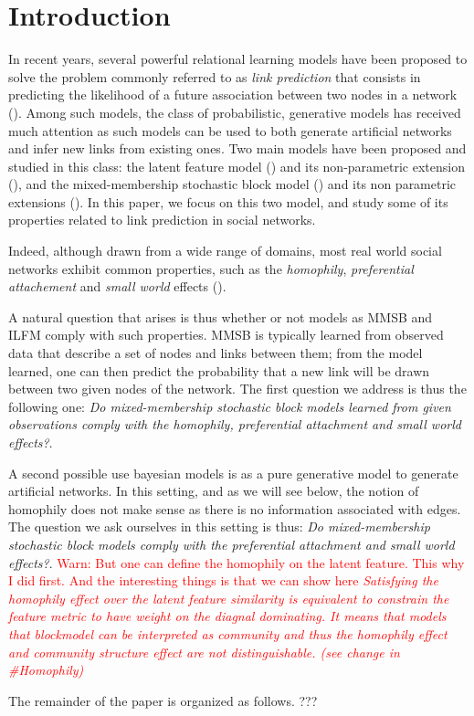 \section{Introduction}
\label{sec:introduction}
In recent years, several powerful relational learning models have been proposed to solve the problem commonly referred to as \textit{link prediction} that consists in predicting the likelihood of a future association between two nodes in a network (\cite{Liben-Nowell07, HassanZaki11}). Among such models, the class of probabilistic, generative models has received much attention as such models can be used to both generate artificial networks and infer new links from existing ones. Two main models have been proposed and studied in this class: the latent feature model (\cite{BMF}) and its non-parametric extension (\cite{ILFRM}), and the mixed-membership stochastic block model (\cite{MMSB}) and its non parametric extensions (\cite{iMMSB,diMMSB}). In this paper, we focus on this two model, and study some of its properties related to link prediction in social networks. 

Indeed, although drawn from a wide range of domains, most real world social networks exhibit common properties, such as the \textit{homophily}, \textit{preferential attachement} and \textit{small world} effects (\cite{Newman2010, Barabasi2003}). 


A natural question that arises is thus whether or not models as MMSB and ILFM comply with such properties. MMSB is typically learned from observed data that describe a set of nodes and links between them; from the model learned, one can then predict the probability that a new link will be drawn between two given nodes of the network. The first question we address is thus the following one: \textit{Do  mixed-membership stochastic block models learned from given observations comply with the homophily, preferential attachment and small world effects?}.

A second possible use bayesian models is as a pure generative model to generate artificial networks. In this setting, and as we will see below, the notion of homophily does not make sense as there is no information associated with edges. The question we ask ourselves in this setting is thus: \textit{Do mixed-membership stochastic block models comply with the preferential attachment and small world effects?}. \textcolor{red}{Warn: But one can define the homophily on the latent feature. This why I did first. And the interesting things is that we can show here \emph{Satisfying the homophily effect over the latent feature similarity is equivalent to constrain the feature metric to have weight on the diagnal dominating. It means that models that blockmodel can be interpreted as community and thus the homophily effect and community structure effect are not distinguishable. (see change in \#Homophily)}}

The remainder of the paper is organized as follows. ???
